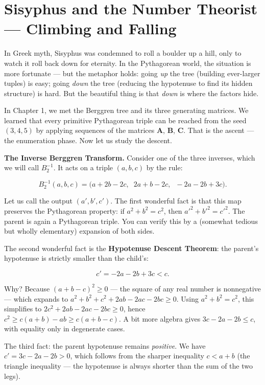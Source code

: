 \bigskip


\section{Sisyphus and the Number Theorist --- Climbing and Falling}

In Greek myth, Sisyphus was condemned to roll a boulder up a hill, only to watch it roll back down for eternity. In the Pythagorean world, the situation is more fortunate --- but the metaphor holds: going \textit{up} the tree (building ever-larger tuples) is easy; going \textit{down} the tree (reducing the hypotenuse to find its hidden structure) is hard. But the beautiful thing is that \textit{down} is where the factors hide.

In Chapter 1, we met the Berggren tree and its three generating matrices. We learned that every primitive Pythagorean triple can be reached from the seed $(3, 4, 5)$ by applying sequences of the matrices $\mathbf{A}$, $\mathbf{B}$, $\mathbf{C}$. That is the ascent --- the enumeration phase. Now let us study the descent.

\textbf{The Inverse Berggren Transform.} Consider one of the three inverses, which we will call $B_2^{-1}$. It acts on a triple $(a, b, c)$ by the rule:

\[
B_2^{-1}(a, b, c) = \big(a + 2b - 2c,\;\; 2a + b - 2c,\;\; -2a - 2b + 3c\big).
\]

Let us call the output $(a', b', c')$. The first wonderful fact is that this map preserves the Pythagorean property: if $a^2 + b^2 = c^2$, then $a'^2 + b'^2 = c'^2$. The parent is again a Pythagorean triple. You can verify this by a (somewhat tedious but wholly elementary) expansion of both sides.

The second wonderful fact is the \textbf{Hypotenuse Descent Theorem}: the parent's hypotenuse is strictly smaller than the child's:

\[
c' = -2a - 2b + 3c < c.
\]

Why? Because $(a + b - c)^2 \geq 0$ --- the square of any real number is nonnegative --- which expands to $a^2 + b^2 + c^2 + 2ab - 2ac - 2bc \geq 0$. Using $a^2 + b^2 = c^2$, this simplifies to $2c^2 + 2ab - 2ac - 2bc \geq 0$, hence $c^2 \geq c(a + b) - ab \geq c(a + b - c)$. A bit more algebra gives $3c - 2a - 2b \leq c$, with equality only in degenerate cases.

The third fact: the parent hypotenuse remains \textit{positive}. We have $c' = 3c - 2a - 2b > 0$, which follows from the sharper inequality $c < a + b$ (the triangle inequality --- the hypotenuse is always shorter than the sum of the two legs).

